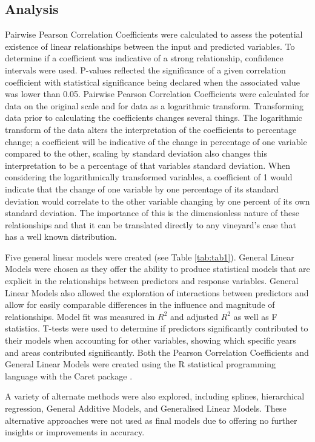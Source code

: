 \documentclass[review,12pt,authoryear]{elsarticle}
\begin{document}
\begin{linenumbers}
\subsection{Analysis}
Pairwise Pearson Correlation Coefficients were calculated to assess the potential existence of linear relationships between the input and predicted variables. To determine if a coefficient was indicative of a strong relationship, confidence intervals were used. P-values reflected the significance of a given correlation coefficient with statistical significance being declared when the associated value was lower than 0.05. Pairwise Pearson Correlation Coefficients were calculated for data on the original scale and for data as a logarithmic transform. Transforming data prior to calculating the coefficients changes several things. The logarithmic transform of the data alters the interpretation of the coefficients to percentage change; a coefficient will be indicative of the change in percentage of one variable compared to the other, scaling by standard deviation also changes this interpretation to be a percentage of that variables standard deviation. When considering the logarithmically transformed variables, a coefficient of 1 would indicate that the change of one variable by one percentage of its standard deviation would correlate to the other variable changing by one percent of its own standard deviation. The importance of this is the dimensionless nature of these relationships and that it can be translated directly to any vineyard's case that has a well known distribution.
\par
Five general linear models were created (see Table \ref{tab:tab1}). General Linear Models were chosen as they offer the ability to produce statistical models that are explicit in the relationships between predictors and response variables. General Linear Models also allowed the exploration of interactions between predictors and allow for easily comparable differences in the influence and magnitude of relationships. Model fit was measured in $R^2$ and adjusted $R^2$ as well as F statistics. T-tests were used to determine if predictors significantly contributed to their models when accounting for other variables, showing which specific years and areas contributed significantly. Both the Pearson Correlation Coefficients and General Linear Models were created using the R statistical programming language \citep{rcoreteamLanguageEnvironmentStatistical2021} with the Caret package \citep{kuhnBuildingPredictiveModels2008}.
\par
A variety of alternate methods were also explored, including splines, hierarchical regression, General Additive Models, and Generalised Linear Models. These alternative approaches were not used as final models due to offering no further insights or improvements in accuracy.
\par

\end{linenumbers}
\end{document}
